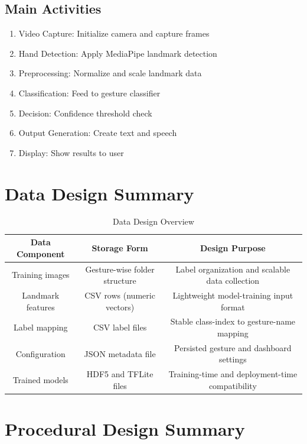 \subsection{Main Activities}

\begin{enumerate}
    \item Video Capture: Initialize camera and capture frames
    \item Hand Detection: Apply MediaPipe landmark detection
    \item Preprocessing: Normalize and scale landmark data
    \item Classification: Feed to gesture classifier
    \item Decision: Confidence threshold check
    \item Output Generation: Create text and speech
    \item Display: Show results to user
\end{enumerate}

\section{Data Design Summary}

\begin{table}[H]
\centering
\begin{tabular}{|c|c|c|}
\hline
\textbf{Data Component} & \textbf{Storage Form} & \textbf{Design Purpose} \\
\hline
Training images & Gesture-wise folder structure & Label organization and scalable data collection \\
\hline
Landmark features & CSV rows (numeric vectors) & Lightweight model-training input format \\
\hline
Label mapping & CSV label files & Stable class-index to gesture-name mapping \\
\hline
Configuration & JSON metadata file & Persisted gesture and dashboard settings \\
\hline
Trained models & HDF5 and TFLite files & Training-time and deployment-time compatibility \\
\hline
\end{tabular}
\caption{Data Design Overview}
\end{table}

\section{Procedural Design Summary}

